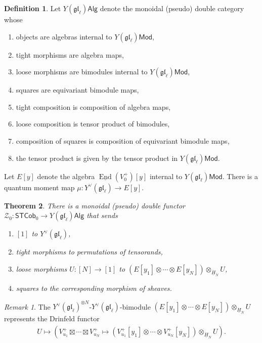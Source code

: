 \documentclass[11pt]{report}
\newtheorem{theorem}{Theorem}[section]
\theoremstyle{definition}
\newtheorem{definition}[theorem]{Definition}
\theoremstyle{remark}
\newtheorem*{remark}{Remark}
\theoremstyle{remark}
\begin{document}
\begin{definition}
Let $Y(\mathfrak{gl}_\ell)\mathsf{Alg}$ denote the monoidal (pseudo) double category whose
\begin{enumerate}[label=(\roman*)]
\item objects are algebras internal to $Y(\mathfrak{gl}_\ell)\mathsf{Mod}$,
\item tight morphisms are algebra maps,
\item loose morphisms are bimodules internal to $Y(\mathfrak{gl}_\ell)\mathsf{Mod}$,
\item squares are equivariant bimodule maps,
\item tight composition is composition of algebra maps,
\item loose composition is tensor product of bimodules,
\item composition of squares is composition of equivariant bimodule maps,
\item the tensor product is given by the tensor product in $Y(\mathfrak{gl}_\ell)\mathsf{Mod}$.
\end{enumerate}
\end{definition}

Let $E[y]$ denote the algebra $\underline{\operatorname{End}}(V_0^+)[y]$ internal to $Y(\mathfrak{gl}_\ell)\mathsf{Mod}$. There is a quantum moment map $\mu: Y^\vee(\mathfrak{gl}_\ell) \to E[y]$.

\begin{theorem}
There is a monoidal (pseudo) double functor $\mathcal{Z}_0: \mathsf{STCob}_0 \to Y(\mathfrak{gl}_\ell)\mathsf{Alg}$ that sends
\begin{enumerate}[label=(\roman*)]
\item $[1]$ to $Y^\vee(\mathfrak{gl}_\ell)$,
\item tight morphisms to permutations of tensorands,
\item loose morphisms $U: [N] \to [1]$ to $(E[y_1] \otimes \cdots \otimes E[y_N]) \otimes_{\underline{\dot H}_N} U$,
\item squares to the corresponding morphism of sheaves.
\end{enumerate}
\end{theorem}

\begin{remark}
The $Y^\vee(\mathfrak{gl}_\ell)^{\otimes N}$-$Y^\vee(\mathfrak{gl}_\ell)$-bimodule $(E[y_1] \otimes \cdots \otimes E[y_N]) \otimes_{\underline{\dot H}_N} U$ represents the Drinfeld functor
\begin{align*}
U \mapsto (V_{u_1}^+ \boxtimes \cdots \boxtimes V_{u_N}^+ \mapsto (V_{u_1}^+[y_1] \otimes \cdots \otimes V_{u_N}^+[y_N]) \otimes_{\underline{\dot H}_N} U).
\end{align*}
\end{remark}
\end{document}
